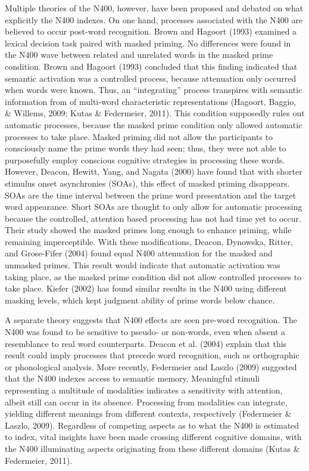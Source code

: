 \documentclass[english,man]{apa6}
\theoremstyle{definition}
\theoremstyle{definition}
\theoremstyle{definition}
\theoremstyle{remark}
\begin{document}
Multiple theories of the N400, however, have been proposed and debated
on what explicitly the N400 indexes. On one hand, processes associated
with the N400 are believed to occur post-word recognition. Brown and
Hagoort (1993) examined a lexical decision task paired with masked
priming. No differences were found in the N400 wave between related and
unrelated words in the masked prime condition. Brown and Hagoort (1993)
concluded that this finding indicated that semantic activation was a
controlled process, because attenuation only occurred when words were
known. Thus, an \enquote{integrating} process transpires with semantic
information from of multi-word characteristic representations (Hagoort,
Baggio, \& Willems, 2009; Kutas \& Federmeier, 2011). This condition
supposedly rules out automatic processes, because the masked prime
condition only allowed automatic processes to take place. Masked priming
did not allow the participants to consciously name the prime words they
had seen; thus, they were not able to purposefully employ conscious
cognitive strategies in processing these words. However, Deacon, Hewitt,
Yang, and Nagata (2000) have found that with shorter stimulus onset
asynchronies (SOAs), this effect of masked priming disappears. SOAs are
the time interval between the prime word presentation and the target
word appearance. Short SOAs are thought to only allow for automatic
processing because the controlled, attention based processing has not
had time yet to occur. Their study showed the masked primes long enough
to enhance priming, while remaining imperceptible. With these
modifications, Deacon, Dynowska, Ritter, and Grose-Fifer (2004) found
equal N400 attenuation for the masked and unmasked primes. This result
would indicate that automatic activation was taking place, as the masked
prime condition did not allow controlled processes to take place. Kiefer
(2002) has found similar results in the N400 using different masking
levels, which kept judgment ability of prime words below chance.

A separate theory suggests that N400 effects are seen pre-word
recognition. The N400 was found to be sensitive to pseudo- or non-words,
even when absent a resemblance to real word counterparts. Deacon et al.
(2004) explain that this result could imply processes that precede word
recognition, such as orthographic or phonological analysis. More
recently, Federmeier and Laszlo (2009) suggested that the N400 indexes
access to semantic memory. Meaningful stimuli representing a multitude
of modalities indicates a sensitivity with attention, albeit still can
occur in its absence. Processing from modalities can integrate, yielding
different meanings from different contexts, respectively (Federmeier \&
Laszlo, 2009). Regardless of competing aspects as to what the N400 is
estimated to index, vital insights have been made crossing different
cognitive domains, with the N400 illuminating aspects originating from
these different domains (Kutas \& Federmeier, 2011).
\end{document}
